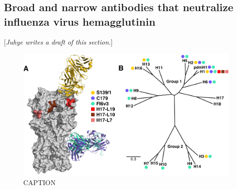 \documentclass[11pt]{article}
\newcommand{\comment}[1]{{\color{red}[\textsl{#1}]}}
\begin{document}
\subsection*{Broad and narrow antibodies that neutralize influenza virus hemagglutinin}
\comment{Juhye writes a draft of this section.}
\begin{figure}
\centerline{\includegraphics[width=\textwidth]{figs/antibody_summary_fig/Ab_summary.pdf}}
\caption{\label{fig:antibody_summary}
CAPTION
}
\end{figure}
\end{document}
